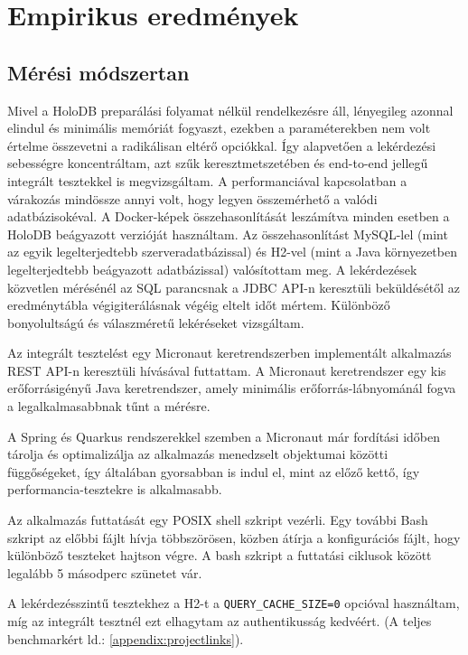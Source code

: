 \documentclass[
    parspace,
    noindent,
    nohyp,
]{elteiktdk}[2023/04/10]
\begin{document}
\section{Empirikus eredmények}

\subsection{Mérési módszertan}

Mivel a HoloDB preparálási folyamat nélkül rendelkezésre áll,
lényegileg azonnal elindul és minimális memóriát fogyaszt,
ezekben a paraméterekben nem volt értelme összevetni
a radikálisan eltérő opciókkal.
Így alapvetően a lekérdezési sebességre koncentráltam,
azt szűk keresztmetszetében és end-to-end jellegű integrált tesztekkel is megvizsgáltam.
A performanciával kapcsolatban a várakozás mindössze annyi volt,
hogy legyen összemérhető a valódi adatbázisokéval.
A Docker-képek összehasonlítását leszámítva minden esetben
a HoloDB beágyazott verzióját használtam.
Az összehasonlítást MySQL-lel (mint az egyik legelterjedtebb szerveradatbázissal)
és H2-vel (mint a Java környezetben legelterjedtebb beágyazott adatbázissal) valósítottam meg.
A lekérdezések közvetlen mérésénél az SQL parancsnak a JDBC API-n keresztüli beküldésétől
az eredménytábla végigiterálásnak végéig eltelt időt mértem.
Különböző bonyolultságú és válaszméretű lekéréseket vizsgáltam.

Az integrált tesztelést egy Micronaut keretrendszerben implementált
alkalmazás REST API-n keresztüli hívásával futtattam.
A Micronaut keretrendszer egy kis erőforrásigényű Java keretrendszer,
amely minimális erőforrás-lábnyománál fogva a legalkalmasabbnak tűnt a mérésre.

A Spring és Quarkus rendszerekkel szemben a Micronaut már fordítási időben
tárolja és optimalizálja az alkalmazás menedzselt objektumai közötti függőségeket,
így általában gyorsabban is indul el, mint az előző kettő,
így performancia-tesztekre is alkalmasabb.

Az alkalmazás futtatását egy POSIX shell szkript vezérli.
Egy további Bash szkript az előbbi fájlt hívja többszörösen,
közben átírja a konfigurációs fájlt, hogy különböző teszteket hajtson végre.
A bash szkript a futtatási ciklusok között legalább 5 másodperc szünetet vár.

A lekérdezésszintű tesztekhez a H2-t a \texttt{QUERY\_CACHE\_SIZE{=}0} opcióval használtam,
míg az integrált tesztnél ezt elhagytam az authentikusság kedvéért.
(A teljes benchmarkért ld.: \autoref{appendix:projectlinks}).
\end{document}
